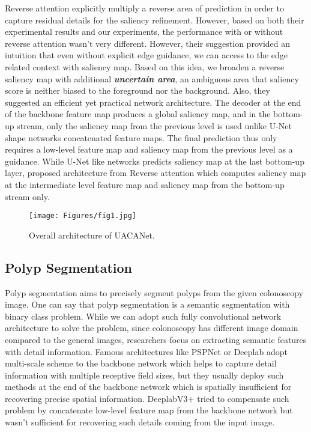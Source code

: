 \documentclass[sigconf]{acmart}
\begin{document}
Reverse attention \cite{chen2018reverse} explicitly multiply a reverse area of prediction in order to capture residual details for the saliency refinement. However, based on both their experimental results and our experiments, the performance with or without reverse attention wasn't very different. However, their suggestion provided an intuition that even without explicit edge guidance, we can access to the edge related context with saliency map. Based on this idea, we broaden a reverse saliency map with additional \textbf{\textit{uncertain area}}, an ambiguous area that saliency score is neither biased to the foreground nor the background. Also, they suggested an efficient yet practical network architecture. The decoder at the end of the backbone feature map produces a global saliency map, and in the bottom-up stream, only the saliency map from the previous level is used unlike U-Net shape networks concatenated feature maps. The final prediction thus only requires a low-level feature map and saliency map from the previous level as a guidance. While U-Net like networks predicts saliency map at the last bottom-up layer, proposed architecture from Reverse attention \cite{chen2018reverse} which computes saliency map at the intermediate level feature map and saliency map from the bottom-up stream only.

\begin{figure*}[]
  \centering
  \texttt{[image: Figures/fig1.jpg]}
  \caption{Overall architecture of UACANet.}
    \label{fig:1}
\end{figure*}

\subsection{Polyp Segmentation}

Polyp segmentation aims to precisely segment polyps from the given colonoscopy image. One can say that polyp segmentation is a semantic segmentation with binary class problem. While we can adopt such fully convolutional network architecture to solve the problem, since colonoscopy has different image domain compared to the general images, researchers focus on extracting semantic features with detail information. Famous architectures like PSPNet or Deeplab adopt multi-scale scheme to the backbone network which helps to capture detail information with multiple receptive field sizes, but they usually deploy such methods at the end of the backbone network which is spatially insufficient for recovering precise spatial information. DeeplabV3+ \cite{chen2017rethinking} tried to compensate such problem by concatenate low-level feature map from the backbone network but wasn't sufficient for recovering such details coming from the input image. 
\end{document}
